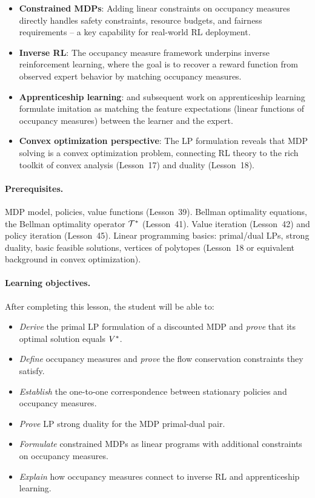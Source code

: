 \documentclass[11pt,a4paper]{article}
\begin{document}
\begin{rlconnection}[title={Why the LP Formulation Matters for RL/ML}]
\begin{itemize}[nosep]
    \item \textbf{Constrained MDPs}: Adding linear constraints on
    occupancy measures directly handles safety constraints, resource
    budgets, and fairness requirements -- a key capability for
    real-world RL deployment.
    \item \textbf{Inverse RL}: The occupancy measure framework
    underpins inverse reinforcement learning, where the goal is to
    recover a reward function from observed expert behavior by
    matching occupancy measures.
    \item \textbf{Apprenticeship learning}: \citet{altman1999} and
    subsequent work on apprenticeship learning formulate imitation
    as matching the feature expectations (linear functions of
    occupancy measures) between the learner and the expert.
    \item \textbf{Convex optimization perspective}: The LP
    formulation reveals that MDP solving is a convex optimization
    problem, connecting RL theory to the rich toolkit of convex
    analysis (Lesson~17) and duality (Lesson~18).
\end{itemize}
\end{rlconnection}

\paragraph{Prerequisites.}
MDP model, policies, value functions (Lesson~39). Bellman optimality
equations, the Bellman optimality operator $\mathcal{T}^*$ (Lesson~41).
Value iteration (Lesson~42) and policy iteration (Lesson~45).
Linear programming basics: primal/dual LPs, strong duality, basic
feasible solutions, vertices of polytopes (Lesson~18 or equivalent
background in convex optimization).

\paragraph{Learning objectives.}
After completing this lesson, the student will be able to:
\begin{itemize}
    \item \emph{Derive} the primal LP formulation of a discounted
    MDP and \emph{prove} that its optimal solution equals $V^*$.
    \item \emph{Define} occupancy measures and \emph{prove} the
    flow conservation constraints they satisfy.
    \item \emph{Establish} the one-to-one correspondence between
    stationary policies and occupancy measures.
    \item \emph{Prove} LP strong duality for the MDP primal-dual pair.
    \item \emph{Formulate} constrained MDPs as linear programs with
    additional constraints on occupancy measures.
    \item \emph{Explain} how occupancy measures connect to inverse
    RL and apprenticeship learning.
\end{itemize}
\end{document}
